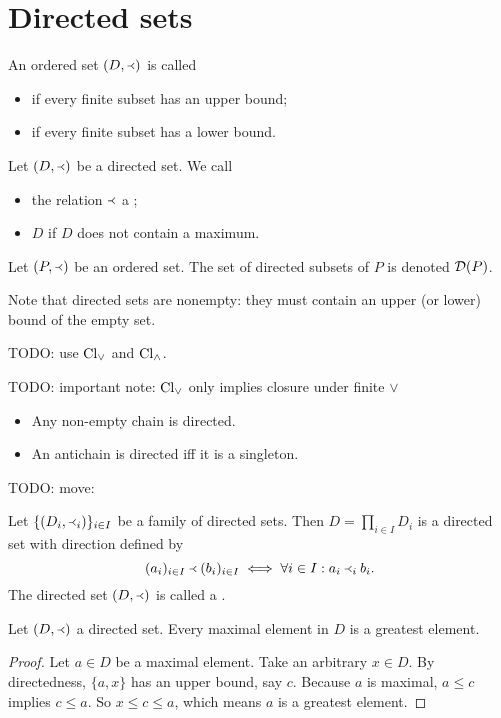 \section{Directed sets}
\begin{definition}
An ordered set $\sSet{D,\Yleft}$ is called
\begin{itemize}
\item {} if every finite subset has an upper bound;
\item {} if every finite subset has a lower bound.
\end{itemize}
Let $(D,\Yleft)$ be a directed set. We call
\begin{itemize}
\item the relation $\Yleft$ a ;
\item $D$  if $D$ does not contain a maximum.
\end{itemize}

Let $\sSet{P,\Yleft}$ be an ordered set. The set of directed subsets of $P$ is denoted $\operatorname{\mathcal{D}}(P)$.


\end{definition}
Note that directed sets are nonempty: they must contain an upper (or lower) bound of the empty set.

TODO: use $\operatorname{Cl}_\vee$ and $\operatorname{Cl}_\wedge$.

TODO: important note: $\operatorname{Cl}_\vee$ only implies closure under finite $\vee$

\begin{example}
\begin{itemize}
\item Any non-empty chain is directed.
\item An antichain is directed iff it is a singleton.
\end{itemize}
\end{example}

TODO: move:
\begin{proposition}
Let $\{(D_i,\Yleft_i)\}_{i\in I}$ be a family of directed sets. Then $D= \prod_{i\in I}D_i$ is a directed set with direction defined by
\[ (a_i)_{i\in I} \Yleft (b_i)_{i\in I} \iff \forall i\in I: a_i\Yleft_i b_i. \]
The directed set $(D,\Yleft)$ is called a .
\end{proposition}

\begin{proposition}
Let $\sSet{D, \Yleft}$ a directed set. Every maximal element in $D$ is a greatest element.
\end{proposition}
\begin{proof}
Let $a\in D$ be a maximal element. Take an arbitrary $x\in D$. By directedness, $\{a,x\}$ has an upper bound, say $c$. Because $a$ is maximal, $a\leq c$ implies $c\leq a$. So $x\leq c\leq a$, which means $a$ is a greatest element.
\end{proof}

